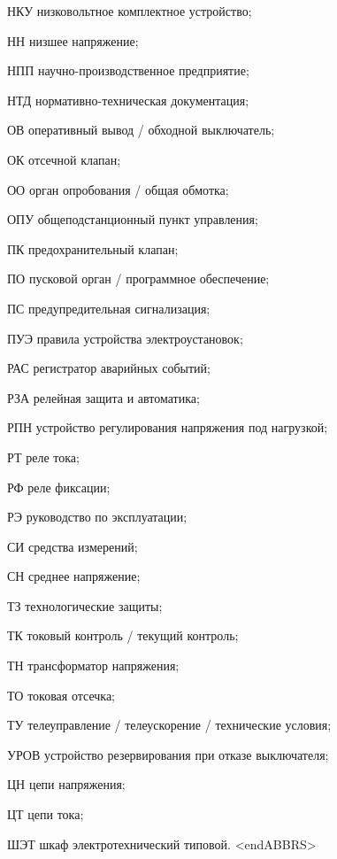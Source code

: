 \begin{list}{}
\item[НКУ] низковольтное комплектное устройство;
\item[НН] низшее напряжение;
\item[НПП] научно-производственное предприятие;
\item[НТД] нормативно-техническая документация;
\item[ОВ] оперативный вывод / обходной выключатель;
\item[ОК] отсечной клапан;
\item[ОО] орган опробования / общая обмотка;
\item[ОПУ] общеподстанционный пункт управления;
\item[ПК] предохранительный клапан;
\item[ПО] пусковой орган / программное обеспечение;
\item[ПС] предупредительная сигнализация;
\item[ПУЭ] правила устройства электроустановок;
\item[РАС] регистратор аварийных событий;
\item[РЗА] релейная защита и автоматика;
\item[РПН] устройство регулирования напряжения под нагрузкой;
\item[РТ] реле тока;
\item[РФ] реле фиксации;
\item[РЭ] руководство по эксплуатации;
\item[СИ] средства измерений;
\item[СН] среднее напряжение;
\item[ТЗ] технологические защиты;
\item[ТК] токовый контроль / текущий контроль;
\item[ТН] трансформатор напряжения;
\item[ТО] токовая отсечка;
\item[ТУ] телеуправление / телеускорение / технические условия;
\item[УРОВ] устройство резервирования при отказе выключателя;
\item[ЦН] цепи напряжения;
\item[ЦТ] цепи тока;
\item[ШЭТ] шкаф электротехнический типовой.
{\color{white}\fontsize{0.1pt}{0.1pt}\selectfont<endABBRS>}
\end{list}
